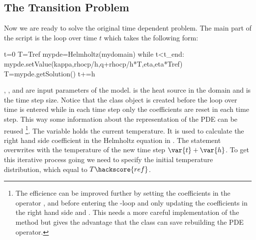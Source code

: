 \subsection{The Transition Problem}
\label{DIFFUSION TRANS SEC}
Now we are ready to solve the original time dependent problem. The main 
part of the script is the loop over time $t$ which takes the following form:
\begin{python}
t=0
T=Tref
mypde=Helmholtz(mydomain)
while t<t_end:
      mypde.setValue(kappa,rhocp/h,q+rhocp/h*T,eta,eta*Tref)
      T=mypde.getSolution()
      t+=h
\end{python}
, ,  and  are input parameters of the model.  is the heat source
in the domain and  is the time step size. Notice that the  class object 
is created before the loop over time is entered while in each time step only the coefficients
are reset in each time step. This way some information about the representation of the PDE can be reused 
\footnote{The efficience can be improved further by setting the coefficients in the operator
,  and  before entering the -loop and only updating the coefficients
in the right hand side  and . This needs a more careful implementation of the 
method but gives the advantage that the \LinearPDE class can save rebuilding the PDE operator.}. The variable 
holds the current temperature. It is used to calculate the right hand side coefficient  in the
Helmholtz equation in . The statement  overwrites  with the 
temperature of the new time step $\var{t}+\var{h}$. To get this iterative process going we need to specify the
initial temperature distribution, which equal to $T\hackscore{ref}$.


